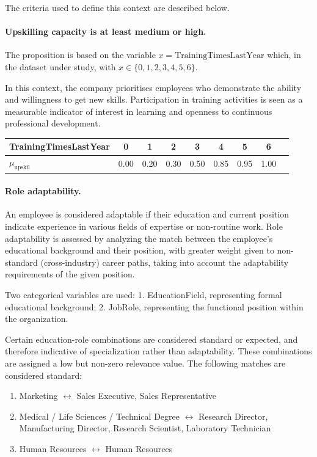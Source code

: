 \documentclass[runningheads]{llncs}
\begin{document}
The criteria used to define this context are described below.
\paragraph{Upskilling capacity is at least medium or high.} 
The proposition is based on the variable $x = \text{TrainingTimesLastYear}$ which, in the dataset under study, with $x \in \{0,1,2,3,4,5,6\}$.

In this context, the company prioritises employees who demonstrate the ability and willingness to get new skills. Participation in training activities is seen as a measurable indicator of interest in learning and openness to continuous professional development.
\begin{table}[h]
\centering
\small
\begin{tabular}{|l|c|c|c|c|c|c|c|c|}
\hline
TrainingTimesLastYear & 0 & 1 & 2 & 3 & 4 & 5 & 6 \\
\hline
$\mu_{\text{upskil}}$ & 0.00 & 0.20 & 0.30 & 0.50 & 0.85 & 0.95 & 1.00 \\
\hline
\end{tabular}
\end{table}
\vspace{-2.4em}

\paragraph{Role adaptability.} An employee is considered adaptable if their education and current position indicate experience in various fields of expertise or non-routine work. Role adaptability is assessed by analyzing the match between the employee's educational background and their position, with greater weight given to non-standard (cross-industry) career paths, taking into account the adaptability requirements of the given position.

Two categorical variables are used: 1. EducationField, representing formal educational background; 2. JobRole, representing the functional position within the organization.

Certain education-role combinations are considered standard or expected, and therefore indicative of specialization rather than adaptability. These combinations are assigned a low but non-zero relevance value. The following matches are considered standard: 

\begin{enumerate}
    \item Marketing $\leftrightarrow$ Sales Executive, Sales Representative 
    \item Medical / Life Sciences / Technical Degree $\leftrightarrow$ Research Director, Manufacturing Director, Research Scientist, Laboratory Technician 
    \item Human Resources $\leftrightarrow$ Human Resources 
\end{enumerate}
\end{document}
